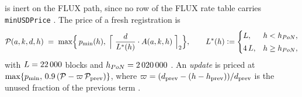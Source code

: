 \begin{definition}
is inert on the FLUX path, since no row of the FLUX rate table carries \texttt{minUSDPrice}
. The price of a fresh
registration is
\[
\mathcal{P}(a,k,d,h) \;=\;
\max\Bigl\{\,p_{\min}(h),\;
\Bigl\lceil\; \frac{d}{L^{\ast}(h)} \cdot A(a,k,h) \;\Bigr\rceil_2 \Bigr\} ,
\qquad
L^{\ast}(h) \vcentcolon= \begin{cases}
L, & h < h_{PoN},\\[2pt]
4\,L, & h \ge h_{PoN},
\end{cases}
\]
with $L = \num{22000}$ blocks  and
$h_{PoN} = \num{2020000}$ 
. An \emph{update} is
priced at $\max\{p_{\min},\, 0.9\,(\mathcal{P} - \varpi\,\mathcal{P}_{\mathrm{prev}})\}$, where
$\varpi = (d_{\mathrm{prev}} - (h - h_{\mathrm{prev}}))/d_{\mathrm{prev}}$ is the unused
fraction of the previous term
.
\end{definition}

